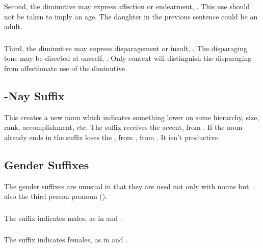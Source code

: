\subsubsection{} Second, the diminutive may express affection or
endearment,  . This use should not be taken to imply an age.  The daughter
in the previous sentence could be an adult.

\subsubsection{} Third, the diminutive may express disparagement or
insult,  .  The disparaging
tone may be directed at oneself,  .  Only context will distinguish
the disparaging from affectionate use of the diminutive.


\subsection{-Nay Suffix} This creates a new noun which indicates
something lower on some hierarchy, size, rank, accomplishment, etc.
The suffix receives the accent,   from  .  If the noun already ends in
 the suffix loses the , 
 from  , 
 from  .  It isn't productive.


\subsection{Gender Suffixes} The gender suffixes are unusual in that
they are used not only with nouns but also the third person pronoun
().  \label{lingop:suffix:gender}

\subsubsection{} The suffix  indicates males, as in
  and  .

\subsubsection{} The suffix  indicates females, as in
  and  .


